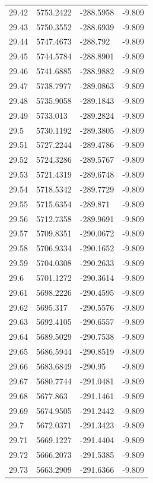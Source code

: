 \begin{table}[H]
\begin{tabular}{llll}
29.42 & 5753.2422 & -288.5958 & -9.809 \\
29.43 & 5750.3552 & -288.6939 & -9.809 \\
29.44 & 5747.4673 & -288.792 & -9.809 \\
29.45 & 5744.5784 & -288.8901 & -9.809 \\
29.46 & 5741.6885 & -288.9882 & -9.809 \\
29.47 & 5738.7977 & -289.0863 & -9.809 \\
29.48 & 5735.9058 & -289.1843 & -9.809 \\
29.49 & 5733.013 & -289.2824 & -9.809 \\
29.5 & 5730.1192 & -289.3805 & -9.809 \\
29.51 & 5727.2244 & -289.4786 & -9.809 \\
29.52 & 5724.3286 & -289.5767 & -9.809 \\
29.53 & 5721.4319 & -289.6748 & -9.809 \\
29.54 & 5718.5342 & -289.7729 & -9.809 \\
29.55 & 5715.6354 & -289.871 & -9.809 \\
29.56 & 5712.7358 & -289.9691 & -9.809 \\
29.57 & 5709.8351 & -290.0672 & -9.809 \\
29.58 & 5706.9334 & -290.1652 & -9.809 \\
29.59 & 5704.0308 & -290.2633 & -9.809 \\
29.6 & 5701.1272 & -290.3614 & -9.809 \\
29.61 & 5698.2226 & -290.4595 & -9.809 \\
29.62 & 5695.317 & -290.5576 & -9.809 \\
29.63 & 5692.4105 & -290.6557 & -9.809 \\
29.64 & 5689.5029 & -290.7538 & -9.809 \\
29.65 & 5686.5944 & -290.8519 & -9.809 \\
29.66 & 5683.6849 & -290.95 & -9.809 \\
29.67 & 5680.7744 & -291.0481 & -9.809 \\
29.68 & 5677.863 & -291.1461 & -9.809 \\
29.69 & 5674.9505 & -291.2442 & -9.809 \\
29.7 & 5672.0371 & -291.3423 & -9.809 \\
29.71 & 5669.1227 & -291.4404 & -9.809 \\
29.72 & 5666.2073 & -291.5385 & -9.809 \\
29.73 & 5663.2909 & -291.6366 & -9.809 \\

\end{tabular}
\end{table}
